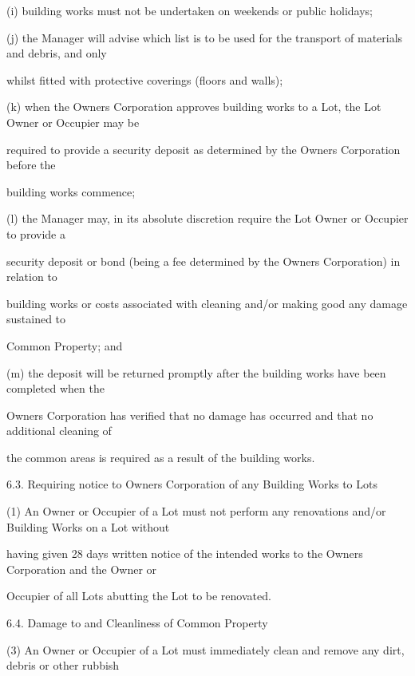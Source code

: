 \documentclass{article}
\begin{document}
{\fontsize{9.962}{1}(i) building works must not be undertaken on weekends or public holidays; }

{\fontsize{9.962}{1}(j) the Manager will advise which list is to be used for the transport of materials and debris, and only }

{\fontsize{10.02}{1}whilst fitted with protective coverings (floors and walls); }

{\fontsize{9.962}{1}(k) when the Owners Corporation approves building works to a Lot, the Lot Owner or Occupier may be }

{\fontsize{10.02}{1}required to provide a security deposit as determined by the Owners Corporation before the }

{\fontsize{10.02}{1}building works commence; }

{\fontsize{9.962}{1}(l) the Manager may, in its absolute discretion require the Lot Owner or Occupier to provide a }

{\fontsize{10.02}{1}security deposit or bond (being a fee determined by the Owners Corporation) in relation to }

{\fontsize{10.02}{1}building works or costs associated with cleaning and/or making good any damage sustained to }

{\fontsize{10.02}{1}Common Property; and }

{\fontsize{9.962}{1}(m) the deposit will be returned promptly after the building works have been completed when the }

{\fontsize{10.02}{1}Owners Corporation has verified that no damage has occurred and that no additional cleaning of }

{\fontsize{10.02}{1}the common areas is required as a result of the building works. }

{\fontsize{9.99}{1}6.3. Requiring notice to Owners Corporation of any Building Works to Lots }

{\fontsize{9.962}{1}(1) An Owner or Occupier of a Lot must not perform any renovations and/or Building Works on a Lot without }

{\fontsize{10.02}{1}having given 28 days written notice of the intended works to the Owners Corporation and the Owner or }

{\fontsize{10.02}{1}Occupier of all Lots abutting the Lot to be renovated. }

{\fontsize{9.99}{1}6.4. Damage to and Cleanliness of Common Property }

{\fontsize{9.962}{1}(3) An Owner or Occupier of a Lot must immediately clean and remove any dirt, debris or other rubbish }
\end{document}
